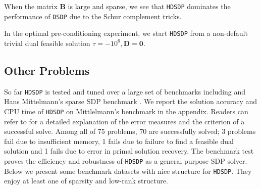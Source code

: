 \documentclass[10pt]{article}
\begin{document}
{When the matrix $\mathbf{B}$ is large and sparse, 
we see that {{\texttt{HDSDP}}} dominates the performance of {{\texttt{DSDP}}} due to the Schur complement tricks.

\begin{remark}
  In the optimal pre-conditioning experiment, we start {{\texttt{HDSDP}}} from
  a non-default trivial dual feasible solution $\tau = - 10^6, \mathbf{D} =
  \textbf{0}$.
\end{remark}

\subsection{Other Problems}

So far {{\texttt{HDSDP}}} is tested and tuned over a large set of benchmarks
including  {\cite{borchers1999sdplib}} and Hans
Mittelmann's sparse SDP benchmark {\cite{mittelmann2003independent}}. We
report the solution accuracy and CPU time of {{\texttt{HDSDP}}} on
Mittlelmann's benchmark in the appendix. Readers can refer to
{\cite{mittelmann2003independent}} for a detailed explanation of the error
measures and the criterion of a successful solve. Among all of 75 problems, 70
are successfully solved; 3 problems fail due to insufficient memory, 1 fails due to failure to 
find a feasible dual solution and 1 fails
 due to error in primal solution recovery. The benchmark test proves the
efficiency and robustness of {{\texttt{HDSDP}}} as a general purpose SDP
solver.  \\

Below we present some benchmark datasets with nice structure
for {{\texttt{HDSDP}}}. They enjoy at least one of sparsity and low-rank
structure.

}
\end{document}

